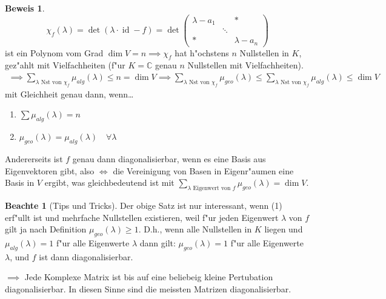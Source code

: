 \documentclass[oneside,fontsize=11pt,paper=a4,BCOR=0mm,DIV=12,automark,headsepline]{scrbook}
\DeclareMathOperator{\mId}{id}
\theoremstyle{remark}
\theoremstyle{definition}
\newtheorem*{notte}{Beachte}
\theoremstyle{definition}
\newtheorem*{prof}{Beweis}
\theoremstyle{remark}
\begin{document}
\begin{prof}
  \[\chi_f(\lambda) = \det(\lambda\cdot\mId - f) = \det
    \begin{pmatrix}
      \lambda - a_1 & & * \\
      & \ddots & \\
      * & & \lambda - a_n
    \end{pmatrix}
  \] ist ein Polynom vom Grad $\dim V = n \implies \chi_f$ hat h"ochstens $n$ Nullstellen in $K$, gez"ahlt mit Vielfachheiten (f"ur \(K = \mathbb{C}\) genau \(n\) Nullstellen mit Vielfachheiten).
  \begin{align*}
    \implies \sum_{\lambda \text{ Nst von } \chi_f}\mu_{alg}(\lambda) \leq n = \dim V \implies \sum_{\lambda\text{ Nst von }\chi_f} \mu_{geo}(\lambda) \leq \sum_{\lambda\text{ Nst von }\chi_f}\mu_{alg}(\lambda) \leq \dim V
  \end{align*}
  mit Gleichheit genau dann, wenn\dots
  \begin{enumerate}
  \item \(\sum\mu_{alg}(\lambda) = n\)
  \item \(\mu_{geo}(\lambda) = \mu_{alg}(\lambda) \quad\forall\lambda\)
  \end{enumerate}

  Andererseits ist $f$ genau dann diagonalisierbar, wenn es eine Basis aus
  Eigenvektoren gibt, also \(\iff\) die Vereinigung von Basen in Eigenr"aumen eine Basis in \(V\) ergibt, was gleichbedeutend ist mit \(\sum_{\lambda \text{ Eigenwert von } f}\mu_{geo}(\lambda) = \dim V\).
\end{prof}

\begin{notte}[Tips und Tricks]
  Der obige Satz ist nur interessant, wenn (1) erf"ullt ist und mehrfache
  Nullstellen existieren, weil f"ur jeden Eigenwert $\lambda$ von $f$ gilt ja
  nach Definition $\mu_{geo}(\lambda)\geq 1$. D.h., wenn alle Nullstellen in
  $K$ liegen und \(\mu_{alg}(\lambda) = 1\) f"ur alle Eigenwerte $\lambda$ dann gilt: \(\mu_{geo}(\lambda) = 1\) f"ur alle
  Eigenwerte $\lambda$, und $f$ ist dann diagonalisierbar.

  $\implies$ Jede Komplexe Matrix ist bis auf eine beliebeig kleine
  Pertubation diagonalisierbar. In diesen Sinne sind \glqq{}die meissten\grqq{} Matrizen diagonalisierbar.
\end{notte}
\end{document}
